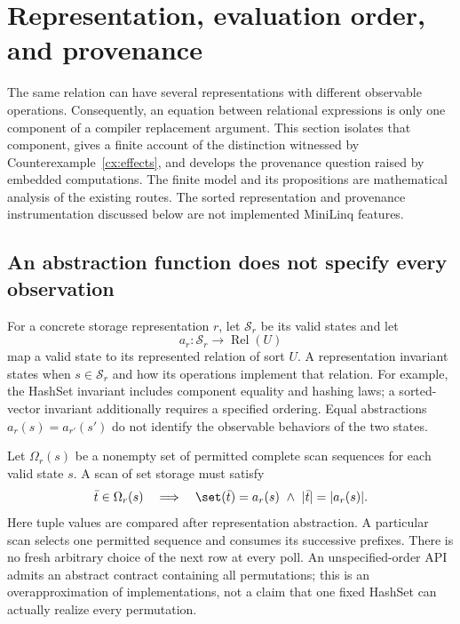 \section{Representation, evaluation order, and provenance}
\label{sec:effects-provenance}
The same relation can have several representations with different observable
operations. Consequently, an equation between relational expressions is only
one component of a compiler replacement argument. This section isolates that
component, gives a finite account of the distinction witnessed by
Counterexample~\ref{cx:effects}, and develops the provenance question raised by
embedded computations. The finite model and its propositions are mathematical
analysis of the existing routes. The sorted representation and provenance
instrumentation discussed below are not implemented MiniLinq features.

\subsection{An abstraction function does not specify every observation}
\label{sec:representation-observations}
For a concrete storage representation $r$, let $\mathcal S_r$ be its valid
states and let
\[
  a_r:\mathcal S_r\longrightarrow \operatorname{Rel}(U)
\]
map a valid state to its represented relation of sort $U$. A representation
invariant states when $s\in\mathcal S_r$ and how its operations implement that
relation. For example, the HashSet invariant includes component equality and
hashing laws; a sorted-vector invariant additionally requires a specified
ordering. Equal abstractions $a_r(s)=a_{r'}(s')$ do not identify the observable
behaviors of the two states.

Let $\Omega_r(s)$ be a nonempty set of permitted complete scan sequences for
each valid state $s$. A scan of
set storage must satisfy
\[
 \bar t\in\Omega_r(s)\quad\Longrightarrow\quad
 \set(\bar t)=a_r(s)\ \land\ |\bar t|=|a_r(s)|.
\]
Here tuple values are compared after representation abstraction. A particular
scan selects one permitted sequence and consumes its successive prefixes.
There is no fresh arbitrary choice of the next row at every poll. An
unspecified-order API admits an abstract contract containing all permutations;
this is an overapproximation of implementations, not a claim that one fixed
HashSet can actually realize every permutation.

